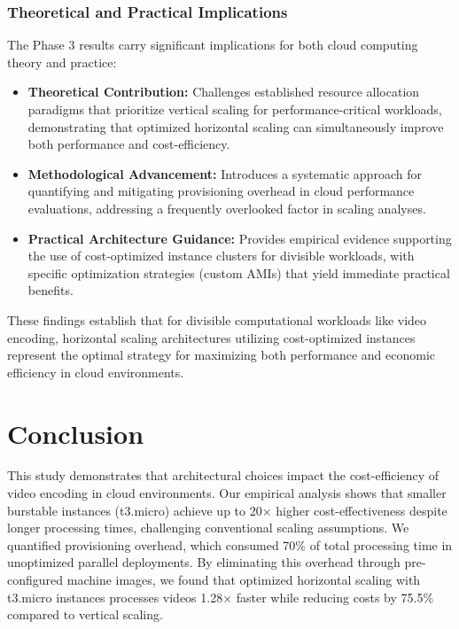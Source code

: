 \documentclass[conference]{IEEEtran}
\begin{document}
	\subsubsection{Theoretical and Practical Implications}
	
	The Phase 3 results carry significant implications for both cloud computing theory and practice:
	
	\begin{itemize}
		\item \textbf{Theoretical Contribution:} Challenges established resource allocation paradigms that prioritize vertical scaling for performance-critical workloads, demonstrating that optimized horizontal scaling can simultaneously improve both performance and cost-efficiency.
		
		\item \textbf{Methodological Advancement:} Introduces a systematic approach for quantifying and mitigating provisioning overhead in cloud performance evaluations, addressing a frequently overlooked factor in scaling analyses.
		
		\item \textbf{Practical Architecture Guidance:} Provides empirical evidence supporting the use of cost-optimized instance clusters for divisible workloads, with specific optimization strategies (custom AMIs) that yield immediate practical benefits.
	\end{itemize}
	
	These findings establish that for divisible computational workloads like video encoding, horizontal scaling architectures utilizing cost-optimized instances represent the optimal strategy for maximizing both performance and economic efficiency in cloud environments.
	
	\section{Conclusion}
	\label{conclusion}
	
	This study demonstrates that architectural choices impact the cost-efficiency of video encoding in cloud environments. Our empirical analysis shows that smaller burstable instances (t3.micro) achieve up to 20× higher cost-effectiveness despite longer processing times, challenging conventional scaling assumptions. We quantified provisioning overhead, which consumed 70\% of total processing time in unoptimized parallel deployments. By eliminating this overhead through pre-configured machine images, we found that optimized horizontal scaling with t3.micro instances processes videos 1.28× faster while reducing costs by 75.5\% compared to vertical scaling.
	
\end{document}
